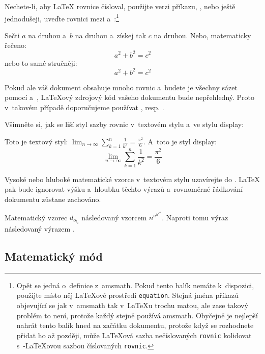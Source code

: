 Nechete-li, aby \LaTeX{} rovnice čísloval, použijte  verzi
příkazu, , nebo ještě jednodušeji, uveďte rovnici
mezi \ci{[} a~\ci{]}:\footnote{
  Opět se jedná o~definice z~\textsf{amsmath}. Pokud
tento balík nemáte k~dispozici, použijte místo něj \LaTeX ové prostředí
\texttt{equation}. Stejná jména příkazů objevující se jak v~\textsf{amsmath}
tak v~\LaTeX u trochu matou, ale zase takový problém to není, protože každý
stejně používá \textsf{amsmath}. Obyčejně je nejlepší nahrát tento balík
hned na začátku dokumentu, protože když se rozhodnete přidat ho až později,
může \LaTeX ová sazba nečíslovaných \texttt{rovnic} kolidovat s~\AmS-\LaTeX ovou
sazbou číslovaných \texttt{rovnic}.}
\begin{example}
Sečti $a$ na druhou
a~$b$ na druhou
a~získej tak $c$ na druhou.
Nebo, matematicky řečeno:
 \begin{equation*}
   a^2 + b^2 = c^2
 \end{equation*}
nebo to samé stručněji:
 \[ a^2 + b^2 = c^2 \]
\end{example}
Pokud ale váš dokument obsahuje mnoho rovnic a~budete je všechny sázet pomocí
\ci{[} a~\ci{]}, \LaTeX ový zdrojový kód vašeho dokumentu bude nepřehledný.
Proto v~takovém případě doporučujeme používat , resp. .

Všimněte si, jak se liší styl sazby rovnic v~textovém stylu
a~ve stylu display:
\begin{example}
Toto je textový styl:
$\lim_{n \to \infty} 
 \sum_{k=1}^n \frac{1}{k^2} 
 = \frac{\pi^2}{6}$.
A~toto je styl display:
 \begin{equation}
  \lim_{n \to \infty} 
  \sum_{k=1}^n \frac{1}{k^2} 
  = \frac{\pi^2}{6}
 \end{equation}
\end{example}

Vysoké nebo hluboké matematické vzorce v~textovém stylu uzavírejte
do . \LaTeX{} pak bude ignorovat výšku a~hloubku
těchto výrazů a~rovnoměrné řádkování dokumentu zůstane zachováno.

\begin{example}
Matematický vzorec $d_{o_{l_u}}$
následovaný vzorcem
$n^{a^{h^{o^{r^u}}}}$. Naproti
tomu  výraz
následovaný výrazem
.
\end{example}

\subsection{Matematický mód}

